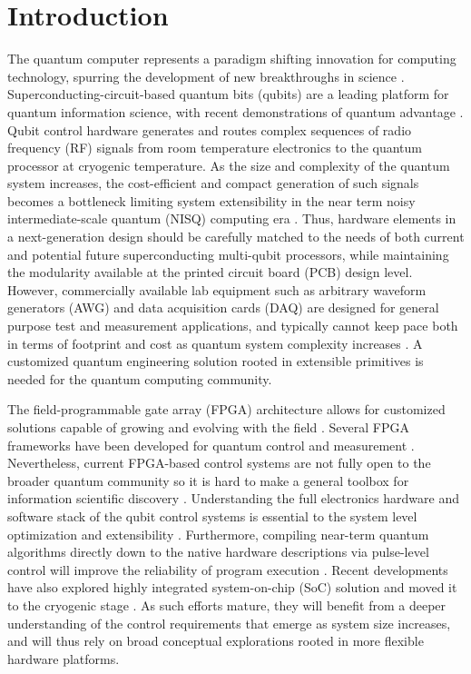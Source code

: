 \documentclass{ieeetran}
\begin{document}
\section{Introduction}
The quantum computer represents a paradigm shifting innovation for computing technology, spurring the development of new breakthroughs in science \cite{preskill2018quantum,google2020hartree}.
Superconducting-circuit-based quantum bits (qubits) are a leading platform for quantum information science, with recent demonstrations of quantum advantage \cite{arute2019quantum}.
Qubit control hardware generates and routes complex sequences of radio frequency (RF) signals from room temperature electronics to the quantum processor at cryogenic temperature. 
As the size and complexity of the quantum system increases, the cost-efficient and compact generation of such signals becomes a bottleneck limiting system extensibility in the near term noisy intermediate-scale quantum (NISQ) computing era \cite{vainsencher2019superconducting}.
Thus, hardware elements in a next-generation design should be carefully matched to the needs of both current and potential future superconducting multi-qubit processors, while maintaining the modularity available at the printed circuit board (PCB) design level. 
However, commercially available lab equipment such as arbitrary waveform generators (AWG) and data acquisition cards (DAQ) are designed for general purpose test and measurement applications, and typically cannot keep pace both in terms of footprint and cost as quantum system complexity increases \cite{ryan2017hardware}. 
A customized quantum engineering solution rooted in extensible primitives is needed for the quantum computing community.

The field-programmable gate array (FPGA) architecture allows for customized solutions capable of growing and evolving with the field \cite{salathe2018low}. 
Several FPGA frameworks have been developed for quantum control and measurement \cite{steffen2013deterministic,riste2013deterministic,bultink2016active,gebauer2020state}.
Nevertheless, current FPGA-based control systems are not fully open to the broader quantum community so it is hard to make a general toolbox for information scientific discovery \cite{chen2012multiplexed,ofek2016extending,fu2017experimental}. 
Understanding the full electronics hardware and software stack of the qubit control systems is essential to the system level optimization and extensibility \cite{bertels2020quantum}.
Furthermore, compiling near-term quantum algorithms directly down to the native hardware descriptions via pulse-level control will improve the reliability of program execution \cite{gokhale2020optimized}.
Recent developments have also explored highly integrated system-on-chip (SoC) solution and moved it to the cryogenic stage \cite{bardin201928,patra2020scalable,pauka2021cryogenic}.
As such efforts mature, they will benefit from a deeper understanding of the control requirements that emerge as system size increases, and will thus rely on broad conceptual explorations rooted in more flexible hardware platforms. 
\end{document}
